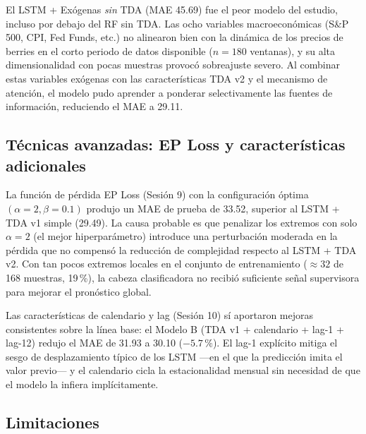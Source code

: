 \documentclass[12pt, a4paper]{article}
\begin{document}
El LSTM + Exógenas \textit{sin} TDA (MAE 45.69) fue el peor modelo del estudio, incluso por
debajo del RF sin TDA. Las ocho variables macroeconómicas (S\&P 500, CPI, Fed Funds, etc.) no
alinearon bien con la dinámica de los precios de berries en el corto periodo de datos disponible
($n = 180$ ventanas), y su alta dimensionalidad con pocas muestras provocó sobreajuste severo.
Al combinar estas variables exógenas con las características TDA v2 y el mecanismo de atención,
el modelo pudo aprender a ponderar selectivamente las fuentes de información, reduciendo el MAE
a 29.11.

\subsection{Técnicas avanzadas: EP Loss y características adicionales}

La función de pérdida EP Loss (Sesión 9) con la configuración óptima $(\alpha=2, \beta=0.1)$
produjo un MAE de prueba de 33.52, superior al LSTM + TDA v1 simple (29.49). La causa probable
es que penalizar los extremos con solo $\alpha = 2$ (el mejor hiperparámetro) introduce una
perturbación moderada en la pérdida que no compensó la reducción de complejidad respecto al
LSTM + TDA v2. Con tan pocos extremos locales en el conjunto de entrenamiento
($\approx 32$ de 168 muestras, 19\,\%), la cabeza clasificadora no recibió suficiente señal
supervisora para mejorar el pronóstico global.

Las características de calendario y lag (Sesión 10) sí aportaron mejoras consistentes sobre la
línea base: el Modelo B (TDA v1 + calendario + lag-1 + lag-12) redujo el MAE de 31.93 a 30.10
($-5.7\,\%$). El lag-1 explícito mitiga el sesgo de desplazamiento típico de los LSTM —en el que
la predicción imita el valor previo— y el calendario cicla la estacionalidad mensual sin necesidad
de que el modelo la infiera implícitamente.

\subsection{Limitaciones}
\end{document}
